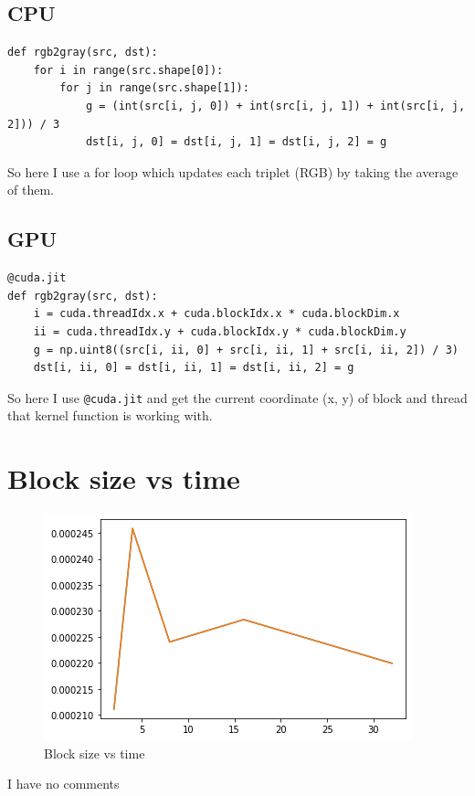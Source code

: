 \documentclass{article}
\begin{document}
\subsection{CPU}

\begin{verbatim}
def rgb2gray(src, dst):
    for i in range(src.shape[0]):
        for j in range(src.shape[1]):
            g = (int(src[i, j, 0]) + int(src[i, j, 1]) + int(src[i, j, 2])) / 3
            dst[i, j, 0] = dst[i, j, 1] = dst[i, j, 2] = g
\end{verbatim}

So here I use a for loop which updates each triplet (RGB) by taking the average of them.

\subsection{GPU}

\begin{verbatim}
@cuda.jit
def rgb2gray(src, dst):
    i = cuda.threadIdx.x + cuda.blockIdx.x * cuda.blockDim.x
    ii = cuda.threadIdx.y + cuda.blockIdx.y * cuda.blockDim.y
    g = np.uint8((src[i, ii, 0] + src[i, ii, 1] + src[i, ii, 2]) / 3)
    dst[i, ii, 0] = dst[i, ii, 1] = dst[i, ii, 2] = g
\end{verbatim}

So here I use \texttt{@cuda.jit} and get the current coordinate (x, y) of block and thread that kernel function is working with.

\section{Block size vs time}

\begin{figure}[htbp]
    \centering
    \includegraphics[scale=0.8]{block_size_vs_time.png}
    \caption{Block size vs time}
    \label{fig:block_size_vs_time}
\end{figure}

I have no comments
\end{document}

